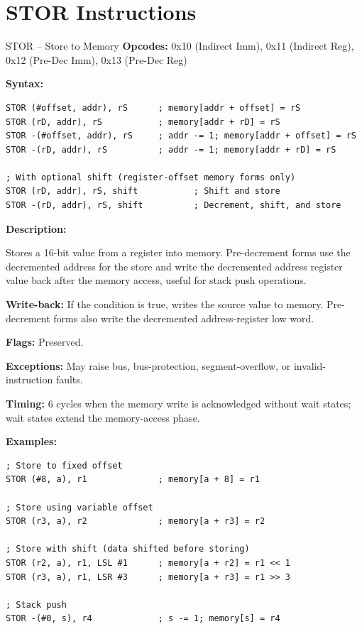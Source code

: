 \section{STOR Instructions}

\begin{instructionbox}{STOR -- Store to Memory}
	\textbf{Opcodes:} 0x10 (Indirect Imm), 0x11 (Indirect Reg), 0x12 (Pre-Dec Imm), 0x13 (Pre-Dec Reg)

	\textbf{Syntax:}
	\begin{lstlisting}
STOR (#offset, addr), rS      ; memory[addr + offset] = rS
STOR (rD, addr), rS           ; memory[addr + rD] = rS
STOR -(#offset, addr), rS     ; addr -= 1; memory[addr + offset] = rS
STOR -(rD, addr), rS          ; addr -= 1; memory[addr + rD] = rS

; With optional shift (register-offset memory forms only)
STOR (rD, addr), rS, shift           ; Shift and store
STOR -(rD, addr), rS, shift          ; Decrement, shift, and store
\end{lstlisting}

	\textbf{Description:}

	Stores a 16-bit value from a register into memory. Pre-decrement forms use the decremented address for the store and
	write the decremented address register value back after the memory access, useful for stack push operations.

	\textbf{Write-back:} If the condition is true, writes the source value to memory. Pre-decrement forms also write the
	decremented address-register low word.

	\textbf{Flags:} Preserved.

	\textbf{Exceptions:} May raise bus, bus-protection, segment-overflow, or invalid-instruction faults.

	\textbf{Timing:} 6 cycles when the memory write is acknowledged without wait states; wait states extend the memory-access
	phase.

	\textbf{Examples:}
	\begin{lstlisting}
; Store to fixed offset
STOR (#8, a), r1              ; memory[a + 8] = r1

; Store using variable offset
STOR (r3, a), r2              ; memory[a + r3] = r2

; Store with shift (data shifted before storing)
STOR (r2, a), r1, LSL #1      ; memory[a + r2] = r1 << 1
STOR (r3, a), r1, LSR #3      ; memory[a + r3] = r1 >> 3

; Stack push
STOR -(#0, s), r4             ; s -= 1; memory[s] = r4
\end{lstlisting}

\end{instructionbox}

